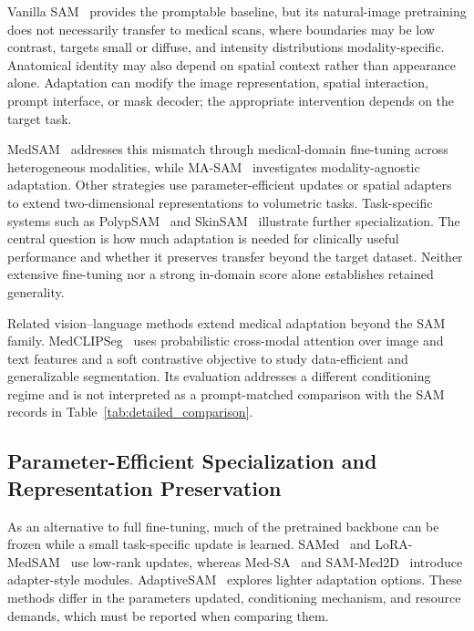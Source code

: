 \documentclass[5p,times,authoryear]{elsarticle}
\begin{document}
Vanilla SAM~\citep{kirillov2023sam} provides the promptable baseline, but its natural-image pretraining does not necessarily transfer to medical scans, where boundaries may be low contrast, targets small or diffuse, and intensity distributions modality-specific. Anatomical identity may also depend on spatial context rather than appearance alone. Adaptation can modify the image representation, spatial interaction, prompt interface, or mask decoder; the appropriate intervention depends on the target task.

MedSAM~\citep{ma2024medsam} addresses this mismatch through medical-domain fine-tuning across heterogeneous modalities, while MA-SAM~\citep{chen2024ma} investigates modality-agnostic adaptation. Other strategies use parameter-efficient updates or spatial adapters to extend two-dimensional representations to volumetric tasks. Task-specific systems such as PolypSAM~\citep{li2024polyp} and SkinSAM~\citep{hu2024skinsam} illustrate further specialization. The central question is how much adaptation is needed for clinically useful performance and whether it preserves transfer beyond the target dataset. Neither extensive fine-tuning nor a strong in-domain score alone establishes retained generality.

Related vision--language methods extend medical adaptation beyond the SAM family. MedCLIPSeg~\citep{koleilat2026medclipseg_cvpr} uses probabilistic cross-modal attention over image and text features and a soft contrastive objective to study data-efficient and generalizable segmentation. Its evaluation addresses a different conditioning regime and is not interpreted as a prompt-matched comparison with the SAM records in Table~\ref{tab:detailed_comparison}.

\subsection{Parameter-Efficient Specialization and Representation Preservation}

As an alternative to full fine-tuning, much of the pretrained backbone can be frozen while a small task-specific update is learned. SAMed~\citep{zhang2023samed} and LoRA-MedSAM~\citep{hu2024lora} use low-rank updates, whereas Med-SA~\citep{wu2025medsa} and SAM-Med2D~\citep{cheng2023sam} introduce adapter-style modules. AdaptiveSAM~\citep{paranjape2024adaptivesam} explores lighter adaptation options. These methods differ in the parameters updated, conditioning mechanism, and resource demands, which must be reported when comparing them.
\end{document}
